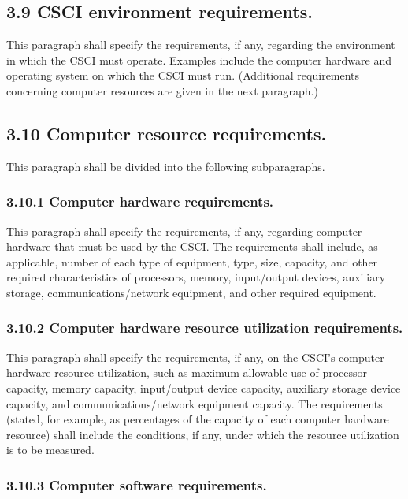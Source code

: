 \subsection{3.9 CSCI environment requirements.}

This paragraph shall specify the requirements, if any, regarding the
environment in which the CSCI must operate. Examples include the
computer hardware and operating system on which the CSCI must run.
(Additional requirements concerning computer resources are given in the
next paragraph.)

\subsection{3.10 Computer resource requirements.}

This paragraph shall be divided into the following subparagraphs.

\subsubsection{3.10.1 Computer hardware requirements.}

This paragraph shall specify the requirements, if any, regarding
computer hardware that must be used by the CSCI. The requirements shall
include, as applicable, number of each type of equipment, type, size,
capacity, and other required characteristics of processors, memory,
input/output devices, auxiliary storage, communications/network
equipment, and other required equipment.

\subsubsection{3.10.2 Computer hardware resource utilization
requirements.}

This paragraph shall specify the requirements, if any, on the CSCI's
computer hardware resource utilization, such as maximum allowable use of
processor capacity, memory capacity, input/output device capacity,
auxiliary storage device capacity, and communications/network equipment
capacity. The requirements (stated, for example, as percentages of the
capacity of each computer hardware resource) shall include the
conditions, if any, under which the resource utilization is to be
measured.

\subsubsection{3.10.3 Computer software requirements.}

